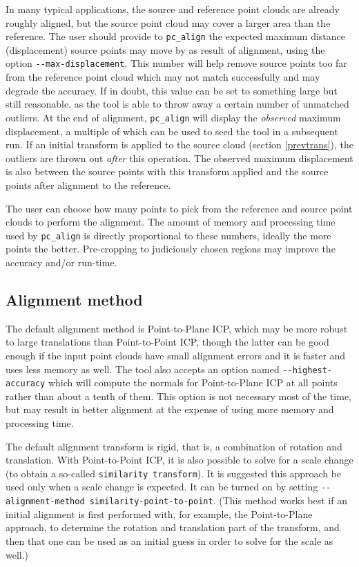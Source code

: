In many typical applications, the source and reference point clouds are
already roughly aligned, but the source point cloud may cover a larger
area than the reference. The user should provide to \texttt{pc\_align}
the expected maximum distance (displacement) source points may move by
as result of alignment, using the option
\texttt{-\/-max-displacement}. This number will help remove source
points too far from the reference point cloud which may not match
successfully and may degrade the accuracy. If in doubt, this value can
be set to something large but still reasonable, as the tool is able to
throw away a certain number of unmatched outliers. At the end of
alignment, \texttt{pc\_align} will display the {\it observed} maximum
displacement, a multiple of which can be used to seed the tool in a
subsequent run. If an initial transform is applied to the source cloud
(section \ref{prevtrans}), the outliers are thrown out \textit{after} this
operation. The observed maximum displacement is also between the source
points with this transform applied and the source points after alignment
to the reference.

The user can choose how many points to pick from the reference and
source point clouds to perform the alignment. The amount of memory and
processing time used by \texttt{pc\_align} is directly proportional to
these numbers, ideally the more points the better. Pre-cropping to
judiciously chosen regions may improve the accuracy and/or run-time.

\subsection{Alignment method}
\label{align-method}

The default alignment method is Point-to-Plane ICP, which may be more
robust to large translations than Point-to-Point ICP, though the latter
can be good enough if the input point clouds have small alignment errors
and it is faster and uses less memory as well.  The tool also accepts an
option named \texttt{-\/-highest-accuracy} which will compute the
normals for Point-to-Plane ICP at all points rather than about a tenth
of them. This option is not necessary most of the time, but may result
in better alignment at the expense of using more memory and processing
time.

The default alignment transform is rigid, that is, a combination of
rotation and translation. With Point-to-Point ICP, it is also possible
to solve for a scale change (to obtain a so-called \texttt{similarity
transform}). It is suggested this approach be used only when a scale
change is expected. It can be turned on by setting
\texttt{-\/-alignment-method similarity-point-to-point}. (This method
works best if an initial alignment is first performed with, for example,
the Point-to-Plane approach, to determine the rotation and translation
part of the transform, and then that one can be used as an initial guess
in order to solve for the scale as well.)

